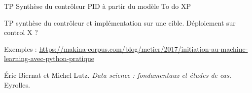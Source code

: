 TP Synthèse du contrôleur PID 
à partir du modèle
To do XP

TP synthèse du contrôleur et implémentation sur une cible. 
Déploiement sur control X ?



\newpage


\newpage

Exemples : 
\url{https://makina-corpus.com/blog/metier/2017/initiation-au-machine-learning-avec-python-pratique}

\begin{thebibliography}{2}
    Éric Biernat et Michel Lutz. {\it Data science : fondamentaux et études de cas.} Eyrolles.
\end{thebibliography}

